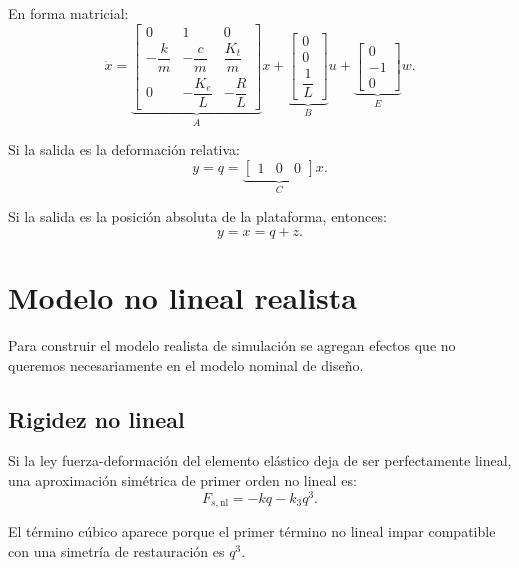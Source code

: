 \documentclass[11pt]{article}
\begin{document}
En forma matricial:
\begin{equation}
\dot x =
\underbrace{
\begin{bmatrix}
0 & 1 & 0\\
-\dfrac{k}{m} & -\dfrac{c}{m} & \dfrac{K_t}{m}\\
0 & -\dfrac{K_e}{L} & -\dfrac{R}{L}
\end{bmatrix}}_{A}
x
+
\underbrace{
\begin{bmatrix}
0\\
0\\
\dfrac{1}{L}
\end{bmatrix}}_{B}
u
+
\underbrace{
\begin{bmatrix}
0\\
-1\\
0
\end{bmatrix}}_{E}
w.
\label{eq:ss_exact}
\end{equation}

Si la salida es la deformaci\'on relativa:
\begin{equation}
y=q=
\underbrace{
\begin{bmatrix}
1 & 0 & 0
\end{bmatrix}}_{C}
x.
\end{equation}

Si la salida es la posici\'on absoluta de la plataforma, entonces:
\begin{equation}
y=x=q+z.
\end{equation}

\section{Modelo no lineal realista}

Para construir el modelo realista de simulaci\'on se agregan efectos que no queremos necesariamente en el modelo nominal de dise\~no.

\subsection{Rigidez no lineal}

Si la ley fuerza-deformaci\'on del elemento el\'astico deja de ser perfectamente lineal, una aproximaci\'on sim\'etrica de primer orden no lineal es:
\begin{equation}
F_{s,\text{nl}} = -kq - k_3 q^3.
\label{eq:cubic}
\end{equation}

El t\'ermino c\'ubico aparece porque el primer t\'ermino no lineal impar compatible con una simetr\'ia de restauraci\'on es $q^3$.
\end{document}
